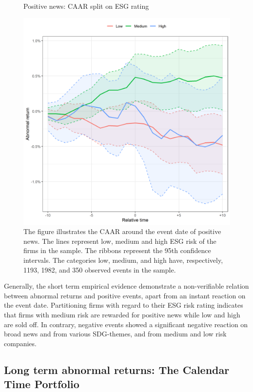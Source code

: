 \begin{figure} [H]
    \centering
    \caption{Positive news: CAAR split on ESG rating}
    \includegraphics[scale=0.6]{Projekt/1.Figures analysis/ST_positive_ESG.png}
     \caption*{\footnotesize The figure illustrates the CAAR around the event date of positive news. The lines represent low, medium and high ESG risk of the firms in the sample. The ribbons represent the 95th confidence intervals. The categories low, medium, and high have, respectively, 1193, 1982, and 350 observed events in the sample.  }
    \label{fig:ST_pos_ESG}
\end{figure} 

Generally, the short term empirical evidence demonstrate a non-verifiable relation between abnormal returns and positive events, apart from an instant reaction on the event date.  Partitioning firms with regard to their ESG risk rating indicates that firms with medium risk are rewarded for positive news while low and high are sold off. In contrary, negative events showed a significant negative reaction on broad news and from various SDG-themes, and from medium and low risk companies.   

\subsection{Long term abnormal returns: The Calendar Time Portfolio} \label{sec: long_term_portfolio}

